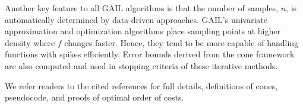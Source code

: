Another key feature to all GAIL algorithms is that the number of samples, $n$, is automatically determined by data-driven approaches. GAIL's
univariate approximation and optimization algorithms place sampling points
at higher density where $f$  changes faster. Hence, they tend to be more
capable of handling functions with spikes efficiently. Error bounds derived
from the cone framework are also computed and used in stopping criteria of
these iterative methods.

We refer readers to the cited references for full details, definitions of
cones, pseudocode,  and proofs of optimal order of costs.
